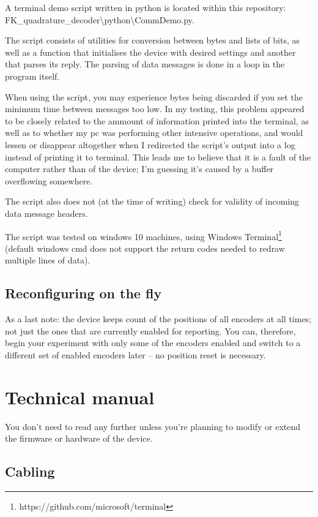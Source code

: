 \documentclass[twoside]{article}
\begin{document}
\noindent{}A terminal demo script written in python is located within this repository:\\ FK\_quadrature\_decoder\textbackslash{}python\textbackslash{}CommDemo.py.

The script consists of utilities for conversion between bytes and lists of bits, as well as a function that initialises the device with desired settings and another that parses its reply. The parsing of data messages is done in a loop in the program itself.

When using the script, you may experience bytes being discarded if you set the minimum time between messages too low. In my testing, this problem appeared to be closely related to the ammount of information printed into the terminal, as well as to whether my pc was performing other intensive operations, and would lessen or disappear altogether when I redirected the script's output into a log instead of printing it to terminal. This leads me to believe that it is a fault of the computer rather than of the device; I'm guessing it's caused by a buffer overflowing somewhere. 

The script also does not (at the time of writing) check for validity of incoming data message headers.

The script was tested on windows 10 machines, using Windows Terminal\footnote{https://github.com/microsoft/terminal} (default windows cmd does not support the return codes needed to redraw multiple lines of data).

\subsection{Reconfiguring on the fly}

As a last note: the device keeps count of the positions of all  encoders at all times; not just the ones that are currently enabled for reporting. You can, therefore, begin your experiment with only some of the encoders enabled and switch to a different set of enabled encoders later -- no position reset is necessary.

\newpage{}
\section{Technical manual}

You don't need to read any further unless you're planning to modify or extend the firmware or hardware of the device.

\subsection{Cabling}
\end{document}
